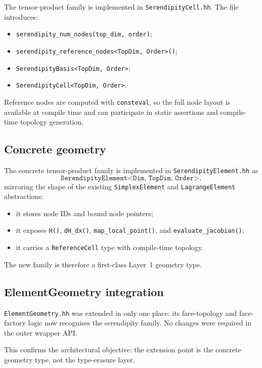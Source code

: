 The tensor-product family is implemented in
\texttt{SerendipityCell.hh}.  The file introduces:

\begin{itemize}[nosep]
  \item \texttt{serendipity\_num\_nodes(top\_dim, order)};
  \item \texttt{serendipity\_reference\_nodes<TopDim, Order>()};
  \item \texttt{SerendipityBasis<TopDim, Order>};
  \item \texttt{SerendipityCell<TopDim, Order>}.
\end{itemize}

Reference nodes are computed with \texttt{consteval}, so the full node layout is
available at compile time and can participate in static assertions and
compile-time topology generation.

\subsection{Concrete geometry}

The concrete tensor-product family is implemented in
\texttt{SerendipityElement.hh} as
\[
\texttt{SerendipityElement<Dim, TopDim, Order>},
\]
mirroring the shape of the existing \texttt{SimplexElement} and
\texttt{LagrangeElement} abstractions:

\begin{itemize}[nosep]
  \item it stores node IDs and bound node pointers;
  \item it exposes \texttt{H()}, \texttt{dH\_dx()},
        \texttt{map\_local\_point()}, and \texttt{evaluate\_jacobian()};
  \item it carries a \texttt{ReferenceCell} type with compile-time topology.
\end{itemize}

The new family is therefore a first-class Layer~1 geometry type.

\subsection{ElementGeometry integration}

\texttt{ElementGeometry.hh} was extended in only one place:
its face-topology and face-factory logic now recognises the serendipity family.
No changes were required in the outer wrapper API.

This confirms the architectural objective:
the extension point is the concrete geometry type, not the type-erasure layer.

